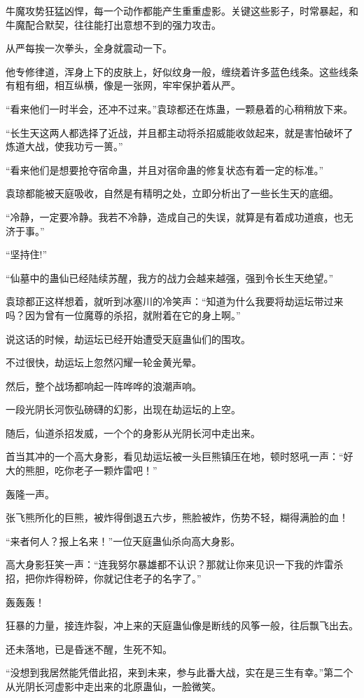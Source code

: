 \begin{this_body}
牛魔攻势狂猛凶悍，每一个动作都能产生重重虚影。关键这些影子，时常暴起，和牛魔配合默契，往往能打出意想不到的强力攻击。

从严每挨一次拳头，全身就震动一下。

他专修律道，浑身上下的皮肤上，好似纹身一般，缠绕着许多蓝色线条。这些线条有粗有细，相互纵横，像是一张网，牢牢保护着从严。

“看来他们一时半会，还冲不过来。”袁琼都还在炼蛊，一颗悬着的心稍稍放下来。

“长生天这两人都选择了近战，并且都主动将杀招威能收敛起来，就是害怕破坏了炼道大战，使我功亏一篑。”

“看来他们是想要抢夺宿命蛊，并且对宿命蛊的修复状态有着一定的标准。”

袁琼都能被天庭吸收，自然是有精明之处，立即分析出了一些长生天的底细。

“冷静，一定要冷静。我若不冷静，造成自己的失误，就算是有着成功道痕，也无济于事。”

“坚持住!”

“仙墓中的蛊仙已经陆续苏醒，我方的战力会越来越强，强到令长生天绝望。”

袁琼都正这样想着，就听到冰塞川的冷笑声：“知道为什么我要将劫运坛带过来吗？因为曾有一位魔尊的杀招，就附着在它的身上啊。”

说这话的时候，劫运坛已经开始遭受天庭蛊仙们的围攻。

不过很快，劫运坛上忽然闪耀一轮金黄光晕。

然后，整个战场都响起一阵哗哗的浪潮声响。

一段光阴长河恢弘磅礴的幻影，出现在劫运坛的上空。

随后，仙道杀招发威，一个个的身影从光阴长河中走出来。

首当其冲的一个高大身影，看见劫运坛被一头巨熊镇压在地，顿时怒吼一声：“好大的熊胆，吃你老子一颗炸雷吧！”

轰隆一声。

张飞熊所化的巨熊，被炸得倒退五六步，熊脸被炸，伤势不轻，糊得满脸的血！

“来者何人？报上名来！”一位天庭蛊仙杀向高大身影。

高大身影狂笑一声：“连我努尔暴雄都不认识？那就让你来见识一下我的炸雷杀招，把你炸得粉碎，你就记住老子的名字了。”

轰轰轰！

狂暴的力量，接连炸裂，冲上来的天庭蛊仙像是断线的风筝一般，往后飘飞出去。

还未落地，已是昏迷不醒，生死不知。

“没想到我居然能凭借此招，来到未来，参与此番大战，实在是三生有幸。”第二个从光阴长河虚影中走出来的北原蛊仙，一脸微笑。


\end{this_body}
